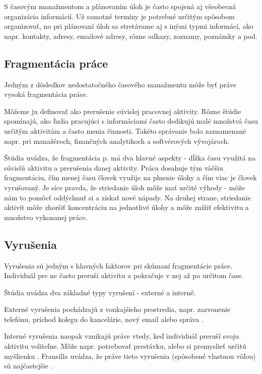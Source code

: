 \documentclass[10pt,slovak,a4paper]{article}
\begin{document}
		S časovým manažmentom a plánovaním úloh je často spojená aj všeobecná organizácia informácií. Už samotné termíny je potrebné určitým spôsobom organizovať, no pri plánovaní úloh sa stretávame aj s inými typmi informácí, ako napr. kontakty, adresy, emailové adresy, rôzne odkazy, zoznamy, poznámky a pod.
	
	\subsection{Fragmentácia práce}
		Jedným z dôsledkov nedostatočného časového manažmentu môže byť práve vysoká fragmentácia práce.
		
		Môžeme ju definovať ako prerušenie súvislej pracovnej aktivity. Rôzne štúdie spomínajú, ako ľudia pracujúci s informáciami často dedikujú malé množstvá času určitým aktivitám a často menia činnosti. Takéto správanie bolo zaznamenané napr. pri manažéroch, finančných analytikoch a softvérových vývojároch\cite{NoTask}.
		
		Štúdia\cite{NoTask} uvádza, že fragmentácia p. má dva hlavné aspekty - dĺžka času využitá na súvislú aktivitu a prerušenia danej aktivity. Práca dosahuje tým väčšiu fragmentáciu, čím menej času človek využije na plnenie úlohy a čím viac je človek vyrušovaný. Je síce pravda, že striedanie úloh môže mať určité výhody - môže nám to pomôcť oddýchnuť si a získať nové nápady. Na druhej strane, striedanie aktivít môže zhoršiť koncentráciu na jednotlivé úlohy a môže znížiť efektivitu a množstvo vykonanej práce\cite{NoTask}.
		
	\subsection{Vyrušenia}
		Vyrušenia sú jedným s hlavných faktorov pri skúmaní fragmentácie práce. Individuál pre ne často preruší aktivitu a pokračuje v nej až po určitom čase.
		
		Štúdia \cite{NoTask} uvádza dva základné typy vyrušení - externé a interné.
		
		Externé vyrušenia pochádzajú z vonkajšieho prostredia, napr. zazvonenie telefónu, príchod kolegu do kancelárie, nový email alebo správa \cite{NoTask}.
		
		Interné vyrušenia naopak vznikajú práve vtedy, keď individuál preruší svoju aktivitu voliteľne. Môže napr. potrebovať prestávku, alebo si premyslieť určitú myšlienku \cite{NoTask}. Fransilla uvádza, že práve tieto vyrušenia (spôsobené vlastnou vôľou) sú najčastejšie \cite{Franssila}.
		
\end{document}

